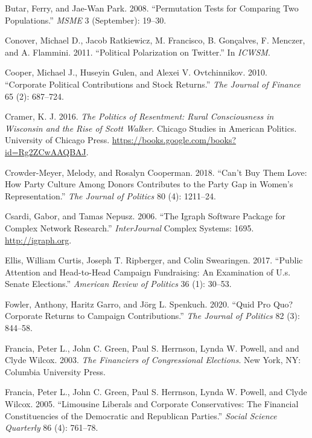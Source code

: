 \documentclass[12pt,]{article}
\begin{document}
\leavevmode\hypertarget{ref-butar2008}{}%
Butar, Ferry, and Jae-Wan Park. 2008. ``Permutation Tests for Comparing
Two Populations.'' \emph{MSME} 3 (September): 19--30.

\leavevmode\hypertarget{ref-conover2011}{}%
Conover, Michael D., Jacob Ratkiewicz, M. Francisco, B. Gonçalves, F.
Menczer, and A. Flammini. 2011. ``Political Polarization on Twitter.''
In \emph{ICWSM}.

\leavevmode\hypertarget{ref-cooper2010}{}%
Cooper, Michael J., Huseyin Gulen, and Alexei V. Ovtchinnikov. 2010.
``Corporate Political Contributions and Stock Returns.'' \emph{The
Journal of Finance} 65 (2): 687--724.

\leavevmode\hypertarget{ref-cramer2016}{}%
Cramer, K. J. 2016. \emph{The Politics of Resentment: Rural
Consciousness in Wisconsin and the Rise of Scott Walker}. Chicago
Studies in American Politics. University of Chicago Press.
\url{https://books.google.com/books?id=Rg2ZCwAAQBAJ}.

\leavevmode\hypertarget{ref-crowder-meyer2018}{}%
Crowder-Meyer, Melody, and Rosalyn Cooperman. 2018. ``Can't Buy Them
Love: How Party Culture Among Donors Contributes to the Party Gap in
Women's Representation.'' \emph{The Journal of Politics} 80 (4):
1211--24.

\leavevmode\hypertarget{ref-igraph}{}%
Csardi, Gabor, and Tamas Nepusz. 2006. ``The Igraph Software Package for
Complex Network Research.'' \emph{InterJournal} Complex Systems: 1695.
\url{http://igraph.org}.

\leavevmode\hypertarget{ref-ellis2017}{}%
Ellis, William Curtis, Joseph T. Ripberger, and Colin Swearingen. 2017.
``Public Attention and Head-to-Head Campaign Fundraising: An Examination
of U.s. Senate Elections.'' \emph{American Review of Politics} 36 (1):
30--53.

\leavevmode\hypertarget{ref-garro2020}{}%
Fowler, Anthony, Haritz Garro, and Jörg L. Spenkuch. 2020. ``Quid Pro
Quo? Corporate Returns to Campaign Contributions.'' \emph{The Journal of
Politics} 82 (3): 844--58.

\leavevmode\hypertarget{ref-francia2003}{}%
Francia, Peter L., John C. Green, Paul S. Herrnson, Lynda W. Powell, and
and Clyde Wilcox. 2003. \emph{The Financiers of Congressional
Elections}. New York, NY: Columbia University Press.

\leavevmode\hypertarget{ref-francia2005}{}%
Francia, Peter L., John C. Green, Paul S. Herrnson, Lynda W. Powell, and
Clyde Wilcox. 2005. ``Limousine Liberals and Corporate Conservatives:
The Financial Constituencies of the Democratic and Republican Parties.''
\emph{Social Science Quarterly} 86 (4): 761--78.
\end{document}
